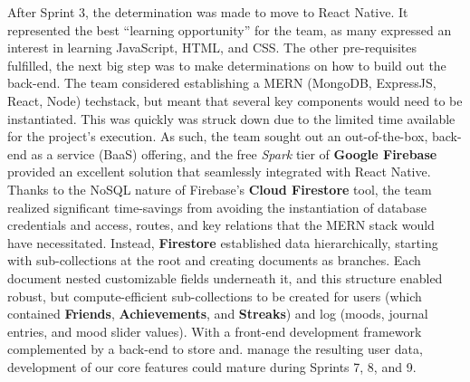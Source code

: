 \documentclass[10pt,american english]{article}
\begin{document}
After Sprint 3, the determination was made to move to React Native. It represented the best ``learning opportunity'' for the team, as many expressed an interest in learning JavaScript, HTML, and CSS. The other pre-requisites fulfilled, the next big step was to make determinations on how to build out the back-end. 
\newline
\newline
The team considered establishing a MERN (MongoDB, ExpressJS, React, Node) techstack, but meant that several key components would need to be instantiated. This was quickly was struck down due to the limited time available for the project's execution. As such, the team sought out an out-of-the-box, back-end as a service (BaaS) offering, and the free \textit{Spark} tier of \textbf{Google Firebase} provided an excellent solution that seamlessly integrated with React Native.
\newline
\newline
Thanks to the NoSQL nature of Firebase's \textbf{Cloud Firestore} tool, the team realized significant time-savings from avoiding the instantiation of database credentials and access, routes, and key relations that the MERN stack would have necessitated. Instead, \textbf{Firestore} established data hierarchically, starting with sub-collections at the root and creating documents as branches. Each document nested customizable fields underneath it, and this structure enabled robust, but compute-efficient sub-collections to be created for users (which contained \textbf{Friends}, \textbf{Achievements}, and \textbf{Streaks}) and log (moods, journal entries, and mood slider values). With a front-end development framework complemented by a back-end to store and. manage the resulting user data, development of our core features could mature during Sprints 7, 8, and 9.
\end{document}
